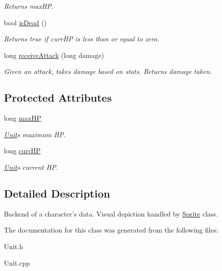 \begin{DoxyCompactItemize}
\begin{DoxyCompactList}\small\item\em Returns max\+HP. \end{DoxyCompactList}\item 
bool \hyperlink{class_unit_a563978d397e42981db23ada6b3c21664}{is\+Dead} ()\hypertarget{class_unit_a563978d397e42981db23ada6b3c21664}{}\label{class_unit_a563978d397e42981db23ada6b3c21664}

\begin{DoxyCompactList}\small\item\em Returns true if curr\+HP is less than or equal to zero. \end{DoxyCompactList}\item 
long \hyperlink{class_unit_a7869a9bab59e707208367b2cbeedb9b1}{receive\+Attack} (long damage)\hypertarget{class_unit_a7869a9bab59e707208367b2cbeedb9b1}{}\label{class_unit_a7869a9bab59e707208367b2cbeedb9b1}

\begin{DoxyCompactList}\small\item\em Given an attack, takes damage based on stats. Returns damage taken. \end{DoxyCompactList}\end{DoxyCompactItemize}
\subsection*{Protected Attributes}
\begin{DoxyCompactItemize}
\item 
long \hyperlink{class_unit_a331291f9274b46a302dc8307518531bb}{max\+HP}\hypertarget{class_unit_a331291f9274b46a302dc8307518531bb}{}\label{class_unit_a331291f9274b46a302dc8307518531bb}

\begin{DoxyCompactList}\small\item\em \hyperlink{class_unit}{Unit}\textquotesingle{}s maximum HP. \end{DoxyCompactList}\item 
long \hyperlink{class_unit_ae49498774522534a20fd57f66ab02139}{curr\+HP}\hypertarget{class_unit_ae49498774522534a20fd57f66ab02139}{}\label{class_unit_ae49498774522534a20fd57f66ab02139}

\begin{DoxyCompactList}\small\item\em \hyperlink{class_unit}{Unit}\textquotesingle{}s current HP. \end{DoxyCompactList}\end{DoxyCompactItemize}


\subsection{Detailed Description}
Backend of a character’s data. Visual depiction handled by \hyperlink{class_sprite}{Sprite} class. 

The documentation for this class was generated from the following files\+:\begin{DoxyCompactItemize}
\item 
Unit.\+h\item 
Unit.\+cpp\end{DoxyCompactItemize}
